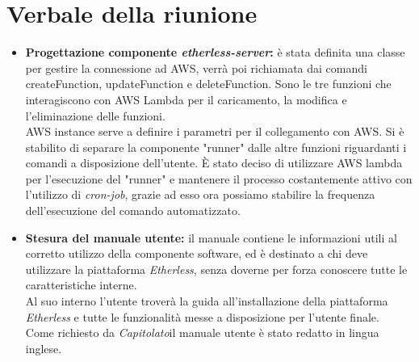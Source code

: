 \section{Verbale della riunione}
	\begin{itemize}
		\item \textbf{Progettazione componente \textit{etherless-server}:}
		è stata definita una classe per gestire la connessione ad AWS, verrà poi richiamata dai comandi createFunction, updateFunction e deleteFunction. Sono le tre funzioni che interagiscono con AWS Lambda per il caricamento, la modifica e l'eliminazione delle funzioni.\\
		AWS instance serve a definire i parametri per il collegamento con AWS.
		Si è stabilito di separare la componente "runner" dalle altre funzioni riguardanti i comandi a disposizione dell'utente.
		È stato deciso di utilizzare AWS lambda per l'esecuzione del "runner" e mantenere il processo costantemente attivo con l'utilizzo di \textit{cron-job\glos}, grazie ad esso ora possiamo stabilire la frequenza dell'esecuzione del comando automatizzato.

		\item \textbf{Stesura del manuale utente:}
		il manuale contiene le informazioni utili al corretto utilizzo della componente software, ed è destinato a chi deve utilizzare la piattaforma \textit{Etherless}, senza doverne per forza conoscere tutte le caratteristiche interne.\\
		Al suo interno l'utente troverà la guida all'installazione della piattaforma \textit{Etherless} e tutte le funzionalità messe a disposizione per l'utente finale.\\
		Come richiesto da \textit{Capitolato}\glo il manuale utente è stato redatto in lingua inglese.

	\end{itemize}
